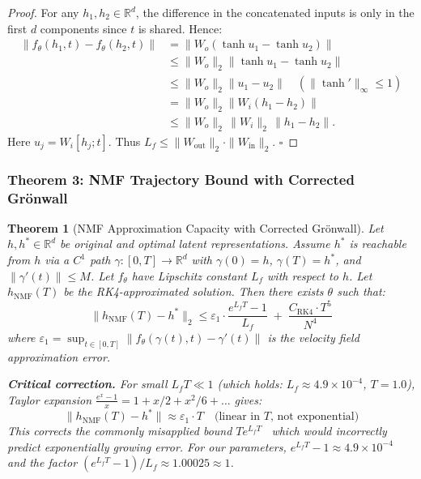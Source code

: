 \documentclass[conference]{IEEEtran}
\newtheorem{theorem}{Theorem}[section]
\newcommand{\RR}{\mathbb{R}}
\begin{document}
\begin{proof}
For any $h_1, h_2 \in \RR^d$, the difference in the concatenated inputs is only in the first $d$ components since $t$ is shared. Hence:
{\footnotesize
\begin{align}
\|f_\theta(h_1,t) - f_\theta(h_2,t)\|
&= \|W_o(\tanh u_1 - \tanh u_2)\| \label{eq:lip-a}\\
&\leq \|W_o\|_2 \|\tanh u_1 - \tanh u_2\| \label{eq:lip-b}\\
&\leq \|W_o\|_2 \|u_1 - u_2\| \quad (\|\tanh'\|_\infty \leq 1) \label{eq:lip-c}\\
&= \|W_o\|_2 \|W_i(h_1-h_2)\| \label{eq:lip-d}\\
&\leq \|W_o\|_2\,\|W_i\|_2\,\|h_1-h_2\|. \label{eq:lip-e}
\end{align}
}
Here $u_j = W_i[h_j;t]$.
Thus $L_f \leq \|W_{\text{out}}\|_2 \cdot \|W_{\text{in}}\|_2$. $\square$
\end{proof}

\subsubsection{Theorem 3: NMF Trajectory Bound with Corrected Gr\"onwall}

\begin{theorem}[NMF Approximation Capacity with Corrected Gr\"onwall]
\label{thm:nmf-traj}
Let $h, h^* \in \RR^d$ be original and optimal latent representations. Assume $h^*$ is reachable from $h$ via a $C^1$ path $\gamma: [0,T] \to \RR^d$ with $\gamma(0) = h$, $\gamma(T) = h^*$, and $\|\gamma'(t)\| \leq M$. Let $f_\theta$ have Lipschitz constant $L_f$ with respect to $h$. Let $h_{\text{NMF}}(T)$ be the RK4-approximated solution. Then there exists $\theta$ such that:
\begin{equation}
\|h_{\text{NMF}}(T) - h^*\|_2 \leq \varepsilon_1 \cdot \frac{e^{L_f T} - 1}{L_f} \;+\; \frac{C_{\text{RK4}} \cdot T^5}{N^4}
\end{equation}
where $\varepsilon_1 = \sup_{t \in [0,T]} \|f_\theta(\gamma(t),t) - \gamma'(t)\|$ is the velocity field approximation error.

\textbf{Critical correction.} For small $L_f T \ll 1$ (which holds: $L_f \approx 4.9\times 10^{-4}$, $T=1.0$), Taylor expansion $\frac{e^x-1}{x} = 1 + x/2 + x^2/6 + \dots$ gives:
\begin{equation}
\|h_{\text{NMF}}(T) - h^*\| \approx \varepsilon_1 \cdot T \quad\text{(linear in $T$, not exponential)}
\end{equation}
This corrects the commonly misapplied bound $T e^{L_f T}$~\cite{chen2018neuralode} which would incorrectly predict exponentially growing error. For our parameters, $e^{L_f T} - 1 \approx 4.9\times 10^{-4}$ and the factor $(e^{L_f T}-1)/L_f \approx 1.00025 \approx 1$.
\end{theorem}
\end{document}
